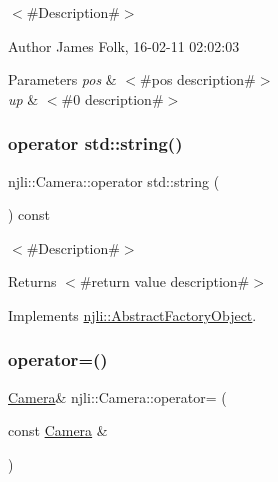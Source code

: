 $<$\#\+Description\#$>$ 

\begin{DoxyAuthor}{Author}
James Folk, 16-\/02-\/11 02\+:02\+:03
\end{DoxyAuthor}

\begin{DoxyParams}{Parameters}
{\em pos} & $<$\#pos description\#$>$ \\
\hline
{\em up} & $<$\#0 description\#$>$ \\
\hline
\end{DoxyParams}
\mbox{\label{classnjli_1_1_camera_aaa7de10337781527205a7eaa5f1c2204}} 
\subsubsection{\texorpdfstring{operator std\+::string()}{operator std::string()}}
{\footnotesize\ttfamily njli\+::\+Camera\+::operator std\+::string (\begin{DoxyParamCaption}{ }\end{DoxyParamCaption}) const\hspace{0.3cm}{\ttfamily [virtual]}}

$<$\#\+Description\#$>$

\begin{DoxyReturn}{Returns}
$<$\#return value description\#$>$ 
\end{DoxyReturn}


Implements \mbox{\hyperlink{classnjli_1_1_abstract_factory_object_a838f4fa7e65cace6098aab5222892942}{njli\+::\+Abstract\+Factory\+Object}}.

\mbox{\label{classnjli_1_1_camera_ad005a1f88da76bf5349fa374889ba0ce}} 
\subsubsection{\texorpdfstring{operator=()}{operator=()}}
{\footnotesize\ttfamily \mbox{\hyperlink{classnjli_1_1_camera}{Camera}}\& njli\+::\+Camera\+::operator= (\begin{DoxyParamCaption}\item[{const \mbox{\hyperlink{classnjli_1_1_camera}{Camera}} \&}]{ }\end{DoxyParamCaption})\hspace{0.3cm}{\ttfamily [protected]}}

